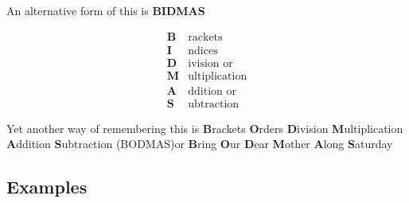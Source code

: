 An alternative form of this is \textbf{BIDMAS}

 \begin{align}
 \textbf{B} &\text{rackets}  \\ 
 \textbf{I} &\text{ndices} \\ 
 \textbf{D} &\text{ivision or} \\ 
 \textbf{M} &\text{ultiplication} \\ 
 \textbf{A} &\text{ddition or} \\ 
 \textbf{S} &\text{ubtraction}
 \end{align}



Yet another way of remembering this is \textbf{B}rackets \textbf{O}rders \textbf{D}ivision
\textbf{M}ultiplication \textbf{A}ddition \textbf{S}ubtraction (BODMAS)or \textbf{B}ring
\textbf{O}ur \textbf{D}ear \textbf{M}other \textbf{A}long \textbf{S}aturday




\subsection{Examples}
\label{sss:exam-bfeb}




